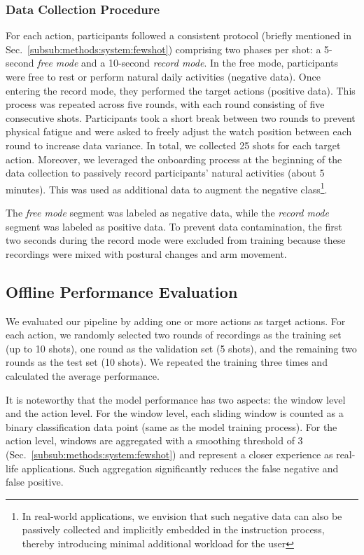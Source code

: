 

\subsubsection{Data Collection Procedure}
For each action, participants followed a consistent protocol (briefly mentioned in Sec.~\ref{subsub:methods:system:fewshot}) comprising two phases per shot: a 5-second \textit{free mode} and a 10-second \textit{record mode}. In the free mode, participants were free to rest or perform natural daily activities (negative data). Once entering the record mode, they performed the target actions (positive data).
This process was repeated across five rounds, with each round consisting of five consecutive shots.
Participants took a short break between two rounds to prevent physical fatigue and were asked to freely adjust the watch position between each round to increase data variance.
In total, we collected 25 shots for each target action.
Moreover, we leveraged the onboarding process at the beginning of the data collection to passively record participants' natural activities (about 5 minutes). This was used as additional data to augment the negative class\footnote{In real-world applications, we envision that such negative data can also be passively collected and implicitly embedded in the instruction process, thereby introducing minimal additional workload for the user}.

The \textit{free mode} segment was labeled as negative data, while the \textit{record mode} segment was labeled as positive data.
To prevent data contamination, the first two seconds during the record mode were excluded from training because these recordings were mixed with postural changes and arm movement.


\subsection{Offline Performance Evaluation}
\label{sub:model_evaluation:pipeline_evaluation}
We evaluated our pipeline by adding one or more actions as target actions.
For each action, we randomly selected two rounds of recordings as the training set (up to 10 shots), one round as the validation set (5 shots), and the remaining two rounds as the test set (10 shots). We repeated the training three times and calculated the average performance.

It is noteworthy that the model performance has two aspects: the window level and the action level. 
For the window level, each sliding window is counted as a binary classification data point (same as the model training process).
For the action level, windows are aggregated with a smoothing threshold of 3 (Sec.~\ref{subsub:methods:system:fewshot}) and represent a closer experience as real-life applications. Such aggregation significantly reduces the false negative and false positive.

